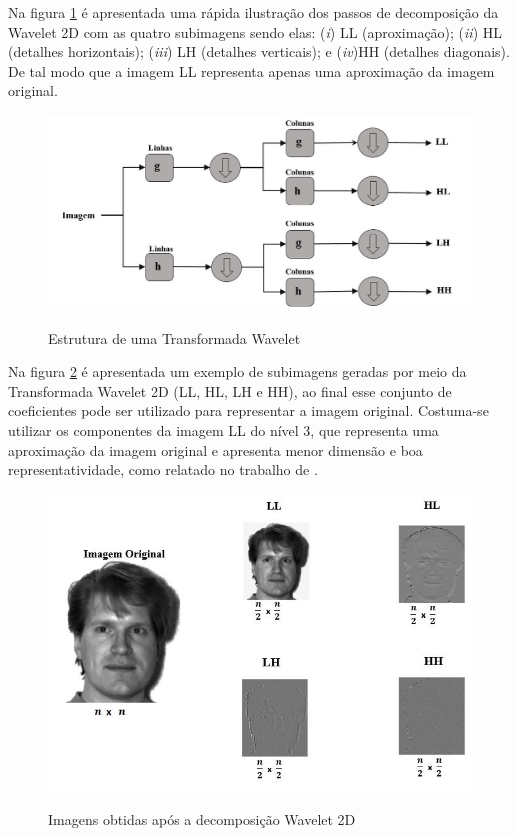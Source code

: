  Na figura \ref{fig:wavelet} é apresentada uma rápida ilustração dos passos de decomposição da Wavelet 2D com as quatro subimagens sendo elas: (\textit{i}) LL (aproximação); (\textit{ii}) HL (detalhes horizontais); (\textit{iii}) LH (detalhes verticais); e (\textit{iv})HH (detalhes diagonais). De tal modo que a imagem LL representa apenas uma aproximação da imagem original. 









\begin{figure}[H]
\centering
\caption{Estrutura de uma Transformada Wavelet}
\includegraphics[scale =0.62]{imgs/decomposicao2d.png}
\label{fig:wavelet}
\end{figure}

Na figura \ref{fig:imgsWavelet} é apresentada um exemplo de subimagens geradas por meio da Transformada Wavelet 2D (LL, HL, LH e HH), ao final esse conjunto de coeficientes pode ser utilizado para representar a imagem original.  Costuma-se utilizar os componentes da imagem LL do nível 3, que representa uma aproximação da imagem original e apresenta menor dimensão e boa representatividade, como relatado no trabalho de  .

\begin{figure}[H]
\centering
\caption{Imagens obtidas após a decomposição Wavelet 2D }
\includegraphics[scale =0.75]{imgs/tw.png}
\label{fig:imgsWavelet}
\end{figure}



